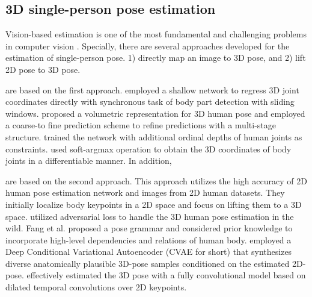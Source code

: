 \documentclass[letterpaper]{article} \usepackage{aaai21}  \usepackage{times}  \usepackage{helvet} \usepackage{courier}  \usepackage[hyphens]{url}  \usepackage{graphicx} \urlstyle{rm} \def\UrlFont{\rm}  \usepackage{natbib}  \usepackage{caption} \frenchspacing  \setlength{\pdfpagewidth}{8.5in}  \setlength{\pdfpageheight}{11in}
\begin{document}
\subsection{3D single-person pose estimation}
Vision-based estimation is one of the most fundamental and challenging problems in computer vision \cite{sun2018integral,habibie2019wild,li20143d,pavlakos2017coarse,pavlakos2018ordinal,zhan2020emlight,zhan2021gmlight,zhan2019esir,zhan2020sagan,zhan2018verisimilar,zhan2019scene,zhan2019gadan,zhan2020aicnet,zhan2019sfgan,zhan2021unite}.
Specially, there are several approaches developed for the estimation of single-person pose. 1) directly map an image to 3D pose, and 2) lift 2D pose to 3D pose.

\cite{zhou2019hemlets,moon2019camera,li2020geometry,li2020cascaded} are based on the first approach. \cite{li20143d} employed a shallow network to regress 3D joint coordinates directly with synchronous task of body part detection with sliding windows. \cite{pavlakos2017coarse} proposed a volumetric representation for 3D human pose and employed a coarse-to fine prediction scheme to refine predictions with a multi-stage structure. \cite{pavlakos2018ordinal} trained the network with additional ordinal depths of human joints as constraints. \cite{sun2018integral} used soft-argmax operation to obtain the 3D coordinates of body joints in a differentiable manner. 
In addition, 


\cite{martinez2017simple,zhou2017towards,fang2017learning,yang20183d,sharma2019monocular,pavllo20193d} are based on the second approach. This approach utilizes the high accuracy of 2D human pose estimation network and images from 2D human datasets. They initially localize body keypoints in a 2D space and focus on lifting them to a 3D space. 
\cite{yang20183d} utilized adversarial loss to handle the 3D human pose estimation in the wild. Fang et al. \cite{fang2017learning} proposed a pose grammar and considered prior knowledge to incorporate high-level dependencies and relations of human body. \cite{sharma2019monocular} employed a Deep Conditional Variational Autoencoder (CVAE for short) that synthesizes diverse anatomically plausible 3D-pose samples conditioned on the estimated 2D-pose. \cite{pavllo20193d} effectively estimated the 3D pose with a fully convolutional model based on dilated temporal convolutions over 2D keypoints.
\end{document}
